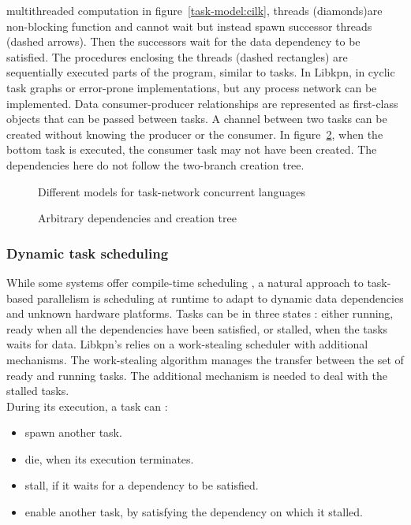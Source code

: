 \documentclass[a4paper,11pt]{article}
\begin{document}
multithreaded computation in figure~\ref{task-model:cilk}, threads (diamonds)are non-blocking function and
cannot wait but instead spawn successor threads (dashed arrows). Then the successors
wait for the data dependency to be satisfied. The procedures enclosing the threads (dashed
rectangles) are sequentially executed parts of the program, similar to tasks. In Libkpn,
in cyclic task graphs or error-prone implementations, but any process network can be
implemented. Data consumer-producer relationships are represented as first-class objects
that can be passed between tasks. A channel between two tasks can be created without
knowing the producer or the consumer. In figure~\ref{task-model-libkpn}, when the bottom task is executed,
the consumer task may not have been created. The dependencies here do not follow the
two-branch creation tree.
\vspace{0.5cm}
\begin{figure}[h]
 
 \caption{Different models for task-network concurrent languages}
 \label{task-model}
\end{figure}

\begin{figure}[h]
  \begin{center}
  
  \end{center}
 \caption{Arbitrary dependencies and creation tree}
 \label{task-model-libkpn}
\end{figure}


\subsubsection{Dynamic task scheduling}
While some systems offer compile-time scheduling \cite{thies2002streamit}, a natural approach to task-based
parallelism is scheduling at runtime to adapt to dynamic data dependencies and unknown
hardware platforms. Tasks can be in three states : either running, ready when all the
dependencies have been satisfied, or stalled, when the tasks waits for data. Libkpn’s relies
on a work-stealing scheduler with additional mechanisms. The work-stealing algorithm
\cite{blumofe_scheduling_1999} manages the transfer between the set of ready and running tasks. The additional
mechanism is needed to deal with the stalled tasks. \\
During its execution, a task can :
\begin{itemize}
 \item spawn another task.
 \item die, when its execution terminates.
 \item stall, if it waits for a dependency to be satisfied.
  \item enable another task, by satisfying the dependency on which it stalled.
\end{itemize}
\end{document}
